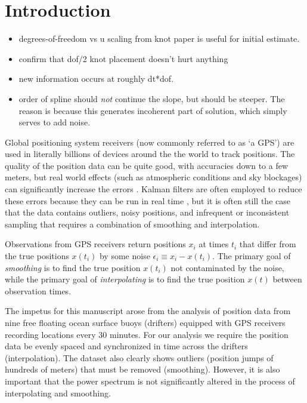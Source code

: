 \documentclass[10pt,journal]{IEEEtran}
\begin{document}

%
\section{Introduction}
%

\begin{itemize}
    \item degrees-of-freedom vs u scaling from knot paper is useful for initial estimate.
    \item confirm that dof/2 knot placement doesn't hurt anything
    \item new information occurs at roughly dt*dof.
    \item order of spline should \emph{not} continue the slope, but should be steeper. The reason is because this generates incoherent part of solution, which simply serves to add noise.
\end{itemize}

Global positioning system receivers (now commonly referred to as `a GPS') are used in literally billions of devices around the the world to track positions. The quality of the position data can be quite good, with accuracies down to a few meters, but real world effects (such as atmospheric conditions and sky blockages) can significantly increase the errors \cite{faa2016-report}. Kalman filters are often employed to reduce these errors because they can be run in real time \cite{brown1997-book}, but it is often still the case that the data  contains outliers, noisy positions, and infrequent or inconsistent sampling that requires a combination of smoothing and interpolation.

Observations from GPS receivers return positions $x_i$ at times $t_i$ that differ from the true positions $x(t_i)$ by some noise $\epsilon_i \equiv x_i - x(t_i)$. The primary goal of \emph{smoothing} is to find the true position $x(t_i)$ not contaminated by the noise, while the primary goal of \emph{interpolating} is to find the true position $x(t)$ between observation times.

The impetus for this manuscript arose from the analysis of position data from nine free floating ocean surface buoys (drifters) equipped with GPS receivers recording locations every 30 minutes. For our analysis we require the position data be evenly spaced and synchronized in time across the drifters (interpolation). The dataset also clearly shows outliers (position jumps of hundreds of meters) that must be removed (smoothing). However, it is also important that the power spectrum is not significantly altered in the process of interpolating and smoothing.
\end{document}
